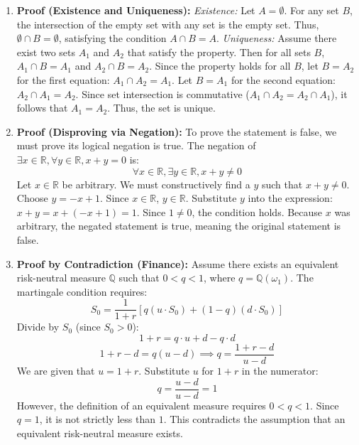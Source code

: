 \documentclass[11pt]{article}
\begin{document}
\begin{enumerate}
    \item \textbf{Proof (Existence and Uniqueness):} 
    \textit{Existence:} Let $A = \emptyset$. For any set $B$, the intersection of the empty set with any set is the empty set. Thus, $\emptyset \cap B = \emptyset$, satisfying the condition $A \cap B = A$.
    \textit{Uniqueness:} Assume there exist two sets $A_1$ and $A_2$ that satisfy the property. Then for all sets $B$, $A_1 \cap B = A_1$ and $A_2 \cap B = A_2$. 
    Since the property holds for all $B$, let $B = A_2$ for the first equation: $A_1 \cap A_2 = A_1$.
    Let $B = A_1$ for the second equation: $A_2 \cap A_1 = A_2$.
    Since set intersection is commutative ($A_1 \cap A_2 = A_2 \cap A_1$), it follows that $A_1 = A_2$. Thus, the set is unique. \qedhere

    \item \textbf{Proof (Disproving via Negation):} To prove the statement is false, we must prove its logical negation is true. The negation of $\exists x \in \mathbb{R}, \forall y \in \mathbb{R}, x + y = 0$ is:
    \[ \forall x \in \mathbb{R}, \exists y \in \mathbb{R}, x + y \neq 0 \]
    Let $x \in \mathbb{R}$ be arbitrary. We must constructively find a $y$ such that $x + y \neq 0$. 
    Choose $y = -x + 1$. Since $x \in \mathbb{R}$, $y \in \mathbb{R}$. 
    Substitute $y$ into the expression: $x + y = x + (-x + 1) = 1$. 
    Since $1 \neq 0$, the condition holds. Because $x$ was arbitrary, the negated statement is true, meaning the original statement is false. \qedhere

    \item \textbf{Proof by Contradiction (Finance):} Assume there exists an equivalent risk-neutral measure $\mathbb{Q}$ such that $0 < q < 1$, where $q = \mathbb{Q}(\omega_1)$. The martingale condition requires:
    \[ S_0 = \frac{1}{1+r} [q(u \cdot S_0) + (1-q)(d \cdot S_0)] \]
    Divide by $S_0$ (since $S_0 > 0$):
    \[ 1+r = q \cdot u + d - q \cdot d \]
    \[ 1+r - d = q(u - d) \implies q = \frac{1+r-d}{u-d} \]
    We are given that $u = 1+r$. Substitute $u$ for $1+r$ in the numerator:
    \[ q = \frac{u - d}{u - d} = 1 \]
    However, the definition of an equivalent measure requires $0 < q < 1$. Since $q = 1$, it is not strictly less than $1$. This contradicts the assumption that an equivalent risk-neutral measure exists. \qedhere


\end{enumerate}
\end{document}
